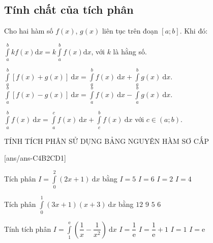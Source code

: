 \subsection{Tính chất của tích phân}
Cho hai hàm số $f(x)$, $g(x)$ liên tục trên đoạn $\left[a;b\right]$. Khi đó:
\begin{tc} $\displaystyle\int\limits_a^bkf(x)\mathrm{d}x=k\displaystyle\int\limits_a^bf(x)\mathrm{d}x$, với $k$ là hằng số.
	\end{tc}
\begin{tc} $\displaystyle\int\limits_a^b\left[f(x)+g(x)\right]\mathrm{~d}x=\displaystyle\int\limits_a^b{f(x)\mathrm{~d}x}+\displaystyle\int\limits_a^bg(x)\mathrm{~d}x$.\\
$\displaystyle\int\limits_a^b\left[f(x)-g(x)\right]\mathrm{~d}x=\displaystyle\int\limits_a^bf(x)\mathrm{~d}x-\displaystyle\int\limits_a^bg(x)\mathrm{~d}x$.
\end{tc}
\begin{tc} $\displaystyle\int\limits_a^bf(x)\mathrm{~d}x=\displaystyle\int\limits_a^cf(x)\mathrm{~d}x+\displaystyle\int\limits_c^bf(x)\mathrm{~d}x$ với $c\in\left(a;b\right)$.
	\end{tc}
\begin{dang}{}
	TÍNH TÍCH PHÂN SỬ DỤNG BẢNG NGUYÊN HÀM SƠ CẤP
	\end{dang}
[ans/ans-C4B2CD1]
\begin{ex}%
Tích phân $ I=\displaystyle\int\limits_0^2(2x+1)\mathrm{~d}x$ bằng
\choice
{$ I=5$}
{\True $ I=6$}
{$ I=2$}
{$ I=4$}
\end{ex}
%
\begin{ex}%
Tích phân $\displaystyle\int\limits_0^1\left(3x+1\right)\left(x+3\right)\mathrm{~d}x$ bằng
\choice
{$ 12$}
{\True $ 9$}
{$ 5$}
{$ 6$}
\end{ex}
%
\begin{ex}%
Tính tích phân $ I=\displaystyle\int\limits_1^\mathrm{e}{\left(\dfrac{1}{x}-\dfrac{1}{x^2}\right)}\mathrm{~d}x$
\choice
{\True $I=\dfrac{1}{\mathrm{e}}$}
{$I=\dfrac{1}{\mathrm{e}}+1$}
{$I=1$}
{$I=\mathrm{e}$}
\end{ex}

